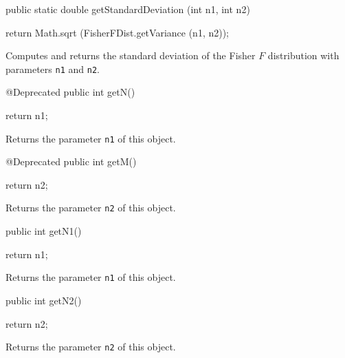 \begin{code}

   public static double getStandardDeviation (int n1, int n2)\begin{hide} {
      return Math.sqrt (FisherFDist.getVariance (n1, n2));
   }\end{hide}
\end{code}
\begin{tabb}  Computes and returns the standard deviation
   of the Fisher $F$ distribution with parameters \texttt{n1} and \texttt{n2}.
\end{tabb}
\begin{htmlonly}
\end{htmlonly}
\begin{hide}\begin{code}

   @Deprecated
   public int getN()\begin{hide} {
      return n1;
   }\end{hide}
\end{code}
 \begin{tabb} Returns the parameter \texttt{n1} of this object.
 \end{tabb}
\begin{code}

   @Deprecated
   public int getM()\begin{hide} {
      return n2;
   }\end{hide}
\end{code}
 \begin{tabb} Returns the parameter \texttt{n2} of this object.
 \end{tabb}\end{hide}
\begin{code}

   public int getN1()\begin{hide} {
      return n1;
   }\end{hide}
\end{code}
 \begin{tabb} Returns the parameter \texttt{n1} of this object.
 \end{tabb}
\begin{code}

   public int getN2()\begin{hide} {
      return n2;
   }\end{hide}
\end{code}
 \begin{tabb} Returns the parameter \texttt{n2} of this object.
 \end{tabb}
